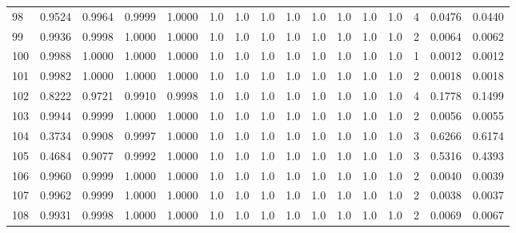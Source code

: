 \begin{tabular}{lrrrrrrrrrrrrrrr}
98  &      0.9524 &  0.9964 &  0.9999 &  1.0000 &     1.0 &     1.0 &     1.0 &     1.0 &     1.0 &     1.0 &      1.0 &        1.0 &      4 &                    0.0476 &                     0.0440 \\
99  &      0.9936 &  0.9998 &  1.0000 &  1.0000 &     1.0 &     1.0 &     1.0 &     1.0 &     1.0 &     1.0 &      1.0 &        1.0 &      2 &                    0.0064 &                     0.0062 \\
100 &      0.9988 &  1.0000 &  1.0000 &  1.0000 &     1.0 &     1.0 &     1.0 &     1.0 &     1.0 &     1.0 &      1.0 &        1.0 &      1 &                    0.0012 &                     0.0012 \\
101 &      0.9982 &  1.0000 &  1.0000 &  1.0000 &     1.0 &     1.0 &     1.0 &     1.0 &     1.0 &     1.0 &      1.0 &        1.0 &      2 &                    0.0018 &                     0.0018 \\
102 &      0.8222 &  0.9721 &  0.9910 &  0.9998 &     1.0 &     1.0 &     1.0 &     1.0 &     1.0 &     1.0 &      1.0 &        1.0 &      4 &                    0.1778 &                     0.1499 \\
103 &      0.9944 &  0.9999 &  1.0000 &  1.0000 &     1.0 &     1.0 &     1.0 &     1.0 &     1.0 &     1.0 &      1.0 &        1.0 &      2 &                    0.0056 &                     0.0055 \\
104 &      0.3734 &  0.9908 &  0.9997 &  1.0000 &     1.0 &     1.0 &     1.0 &     1.0 &     1.0 &     1.0 &      1.0 &        1.0 &      3 &                    0.6266 &                     0.6174 \\
105 &      0.4684 &  0.9077 &  0.9992 &  1.0000 &     1.0 &     1.0 &     1.0 &     1.0 &     1.0 &     1.0 &      1.0 &        1.0 &      3 &                    0.5316 &                     0.4393 \\
106 &      0.9960 &  0.9999 &  1.0000 &  1.0000 &     1.0 &     1.0 &     1.0 &     1.0 &     1.0 &     1.0 &      1.0 &        1.0 &      2 &                    0.0040 &                     0.0039 \\
107 &      0.9962 &  0.9999 &  1.0000 &  1.0000 &     1.0 &     1.0 &     1.0 &     1.0 &     1.0 &     1.0 &      1.0 &        1.0 &      2 &                    0.0038 &                     0.0037 \\
108 &      0.9931 &  0.9998 &  1.0000 &  1.0000 &     1.0 &     1.0 &     1.0 &     1.0 &     1.0 &     1.0 &      1.0 &        1.0 &      2 &                    0.0069 &                     0.0067 \\

\end{tabular}

